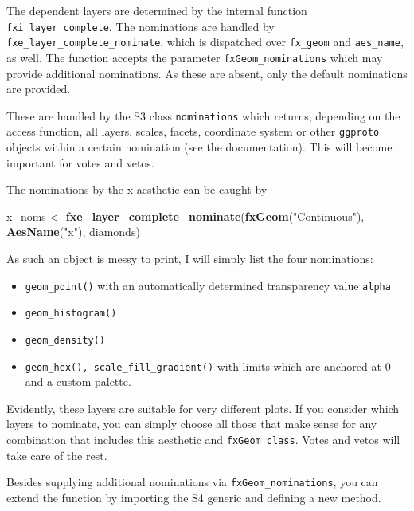 \documentclass[]{report}
\newenvironment{Shaded}{\begin{snugshade}}{\end{snugshade}}
\newcommand{\KeywordTok}[1]{\textcolor[rgb]{0.13,0.29,0.53}{\textbf{#1}}}
\newcommand{\StringTok}[1]{\textcolor[rgb]{0.31,0.60,0.02}{#1}}
\newcommand{\NormalTok}[1]{#1}
\providecommand{\tightlist}{%
  \setlength{\itemsep}{0pt}\setlength{\parskip}{0pt}}
\theoremstyle{definition}
\theoremstyle{definition}
\theoremstyle{definition}
\theoremstyle{remark}
\begin{document}
The dependent layers are determined by the internal function
\texttt{fxi\_layer\_complete}. The nominations are handled by
\texttt{fxe\_layer\_complete\_nominate}, which is dispatched over
\texttt{fx\_geom} and \texttt{aes\_name}, as well. The function accepts
the parameter \texttt{fxGeom\_nominations} which may provide additional
nominations. As these are absent, only the default nominations are
provided.

These are handled by the S3 class \texttt{nominations} which returns,
depending on the access function, all layers, scales, facets, coordinate
system or other \texttt{ggproto} objects within a certain nomination
(see the documentation). This will become important for votes and vetos.

The nominations by the x aesthetic can be caught by

\begin{Shaded}
\begin{Highlighting}[]
\NormalTok{x_noms <-}\StringTok{ }\KeywordTok{fxe_layer_complete_nominate}\NormalTok{(}\KeywordTok{fxGeom}\NormalTok{(}\StringTok{"Continuous"}\NormalTok{), }\KeywordTok{AesName}\NormalTok{(}\StringTok{"x"}\NormalTok{), diamonds)}
\end{Highlighting}
\end{Shaded}

As such an object is messy to print, I will simply list the four
nominations:

\begin{itemize}
\tightlist
\item
  \texttt{geom\_point()} with an automatically determined transparency
  value \texttt{alpha}
\item
  \texttt{geom\_histogram()}
\item
  \texttt{geom\_density()}
\item
  \texttt{geom\_hex(),\ scale\_fill\_gradient()} with limits which are
  anchored at 0 and a custom palette.
\end{itemize}

Evidently, these layers are suitable for very different plots. If you
consider which layers to nominate, you can simply choose all those that
make sense for any combination that includes this aesthetic and
\texttt{fxGeom\_class}. Votes and vetos will take care of the rest.

Besides supplying additional nominations via
\texttt{fxGeom\_nominations}, you can extend the function by importing
the S4 generic and defining a new method.
\end{document}
